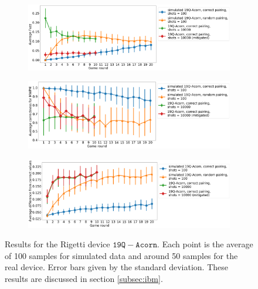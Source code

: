\documentclass[aps,prl,twocolumn,showpacs,preprintnumbers]{revtex4-1}
\begin{document}
\begin{figure}
    \centering
    \begin{subfigure}[b]{\textwidth}
        \includegraphics[width=\textwidth]{figures/acorn_fuzz.png}
    \end{subfigure}
    \begin{subfigure}[b]{\textwidth}
        \includegraphics[width=\textwidth]{figures/acorn_mwpm.png}
    \end{subfigure}
    \begin{subfigure}[b]{\textwidth}
        \includegraphics[width=\textwidth]{figures/acorn_diff.png}
    \end{subfigure}
    \caption{Results for the Rigetti device $\mathtt{19Q-Acorn}$. Each point is the average of 100 samples for simulated data and around 50 samples for the real device. Error bars given by the standard deviation. These results are discussed in section \ref{subsec:ibm}.}\label{fig:acorn}
\end{figure}
\pagebreak
\end{document}

